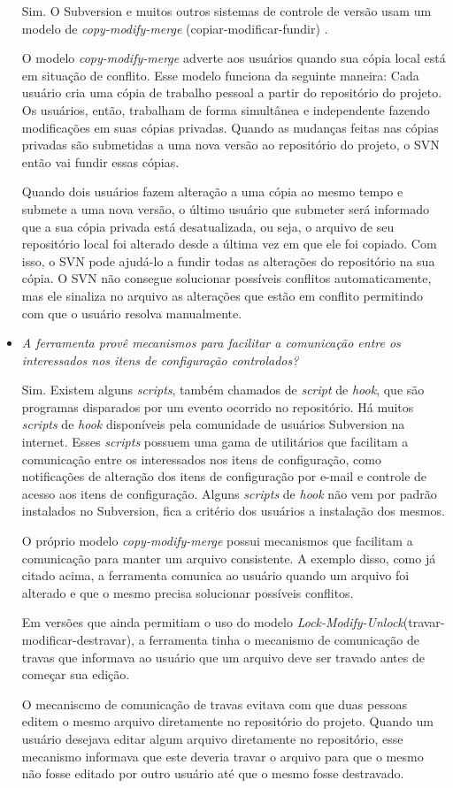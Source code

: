 \begin{itemize}
  Sim. O Subversion e muitos outros sistemas de controle de versão usam um modelo de \textit{copy-modify-merge} (copiar-modificar-fundir) \cite{svn-book}. 
  
  O modelo \textit{copy-modify-merge} adverte aos usuários quando sua cópia local está em situação de conflito.
  Esse modelo funciona da seguinte maneira: 
  Cada usuário cria uma cópia de trabalho pessoal a partir do repositório do projeto. Os usuários, então, 
  trabalham de forma simultânea e independente fazendo modificações em suas cópias privadas. Quando as mudanças 
  feitas nas cópias privadas são submetidas a uma nova versão ao repositório do projeto, o SVN então vai fundir essas cópias.
  
  Quando dois usuários fazem alteração a uma cópia ao mesmo tempo e submete a uma nova versão, o último usuário que submeter será informado
  que a sua cópia privada está desatualizada, ou seja, o arquivo de seu repositório local foi alterado desde a 
  última vez em que ele foi copiado. Com isso, o SVN pode ajudá-lo a fundir todas as alterações do repositório na sua cópia. 
  O SVN não consegue solucionar possíveis conflitos automaticamente, mas ele sinaliza no arquivo as alterações que estão em conflito
   permitindo com que o usuário resolva manualmente.
   
     \item \textit{A ferramenta provê mecanismos para facilitar a comunicação entre os interessados nos itens de
  configuração controlados?}
  
  Sim. Existem alguns \textit{scripts}, também chamados de \textit{script} de \textit{hook}, que são programas disparados por um evento ocorrido no repositório\cite{svn-book}.
  Há muitos \textit{scripts} de \textit{hook} disponíveis pela comunidade de usuários Subversion na internet. Esses \textit{scripts} possuem uma gama de utilitários que facilitam 
  a comunicação entre os interessados nos itens de configuração, como notificações de alteração dos itens de configuração por e-mail 
  e controle de acesso aos itens de configuração. Alguns \textit{scripts} de \textit{hook} não vem por padrão instalados no Subversion, fica a critério dos usuários a instalação dos mesmos.
  
  O próprio modelo \textit{copy-modify-merge} possui mecanismos que facilitam a comunicação para manter um arquivo consistente.
  A exemplo disso, como já citado acima, a ferramenta comunica ao usuário quando um arquivo foi alterado e que o mesmo precisa solucionar
  possíveis conflitos.
  
  Em versões que ainda permitiam o uso do modelo \textit{Lock-Modify-Unlock}(travar-modificar-destravar), a ferramenta tinha o mecanismo de comunicação de travas que informava ao usuário que um arquivo deve ser travado antes 
  de começar sua edição. 
  
  O mecaniscmo de comunicação de travas evitava com que duas pessoas editem o mesmo arquivo diretamente no repositório do projeto. Quando
  um usuário desejava editar algum arquivo diretamente no repositório, esse mecanismo informava que este deveria travar o arquivo para que o mesmo 
  não fosse editado por outro usuário até que o mesmo fosse destravado.
\end{itemize}

